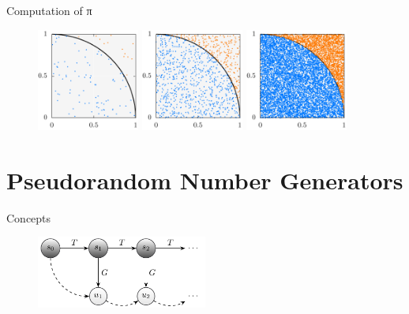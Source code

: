\documentclass[aspectratio=169]{beamer}
\begin{document}
    \begin{frame}{Computation of π}
      \begin{figure}
        \includegraphics[width=0.3\textwidth]{figures/monte_carlo_pi_100_87.pdf}
        \includegraphics[width=0.3\textwidth]{figures/monte_carlo_pi_1000_765.pdf}
        \includegraphics[width=0.3\textwidth]{figures/monte_carlo_pi_10000_7856.pdf}
      \end{figure}
    \end{frame}

  \section{Pseudorandom Number Generators} %
  \label{sec:pseudorandom_number_generators}
    \begin{frame}{Concepts}
      \begin{figure}
        \includegraphics[width=0.5\textwidth]{figures/sequence_generation_scheme.pdf}
      \end{figure}
    \end{frame}
\end{document}
